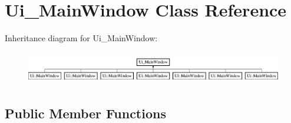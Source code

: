 \section{Ui\+\_\+\+Main\+Window Class Reference}
\label{class_ui___main_window}
Inheritance diagram for Ui\+\_\+\+Main\+Window\+:\begin{figure}[H]
\begin{center}
\leavevmode
\includegraphics[height=1.454545cm]{class_ui___main_window}
\end{center}
\end{figure}
\subsection*{Public Member Functions}
